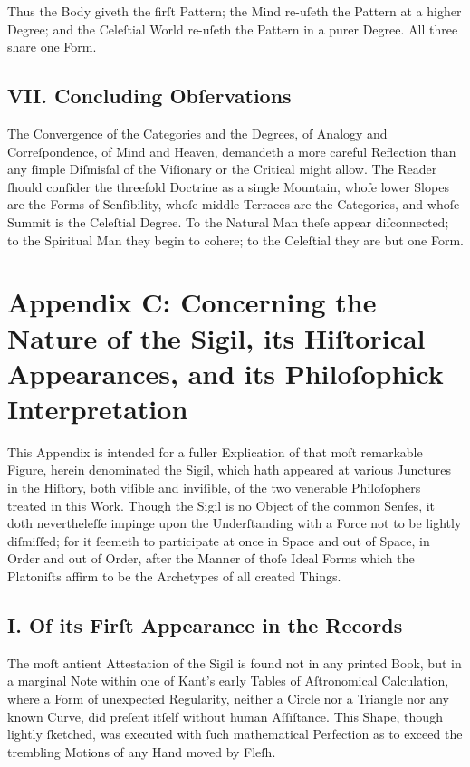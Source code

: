 \documentclass[12pt]{article}
\begin{document}
Thus the Body giveth the firſt Pattern; the Mind re-uſeth the Pattern at a 
higher Degree; and the Celeſtial World re-uſeth the Pattern in a purer Degree. 
All three share one Form.

\subsection*{VII. Concluding Obſervations}
The Convergence of the Categories and the Degrees, of Analogy and 
Correſpondence, of Mind and Heaven, demandeth a more careful Reflection than 
any ſimple Diſmisſal of the Viſionary or the Critical might allow. The Reader 
ſhould conſider the threefold Doctrine as a single Mountain, whoſe lower Slopes 
are the Forms of Senſibility, whoſe middle Terraces are the Categories, and 
whoſe Summit is the Celeſtial Degree. To the Natural Man theſe appear diſconnected; 
to the Spiritual Man they begin to cohere; to the Celeſtial they are but one 
Form.

\newpage

\section*{Appendix C: Concerning the Nature of the Sigil, its Hiſtorical Appearances, and its Philoſophick Interpretation}

This Appendix is intended for a fuller Explication of that moſt remarkable 
Figure, herein denominated the Sigil, which hath appeared at various Junctures 
in the Hiſtory, both viſible and inviſible, of the two venerable Philoſophers 
treated in this Work. Though the Sigil is no Object of the common Senſes, it 
doth nevertheleſſe impinge upon the Underſtanding with a Force not to be 
lightly diſmiſſed; for it ſeemeth to participate at once in Space and out of 
Space, in Order and out of Order, after the Manner of thoſe Ideal Forms which 
the Platoniſts affirm to be the Archetypes of all created Things.

\subsection*{I. Of its Firſt Appearance in the Records}
The moſt antient Attestation of the Sigil is found not in any printed Book, but 
in a marginal Note within one of Kant’s early Tables of Aſtronomical 
Calculation, where a Form of unexpected Regularity, neither a Circle nor a 
Triangle nor any known Curve, did preſent itſelf without human Aſſiſtance. 
This Shape, though lightly ſketched, was executed with ſuch mathematical 
Perfection as to exceed the trembling Motions of any Hand moved by Fleſh.
\end{document}
